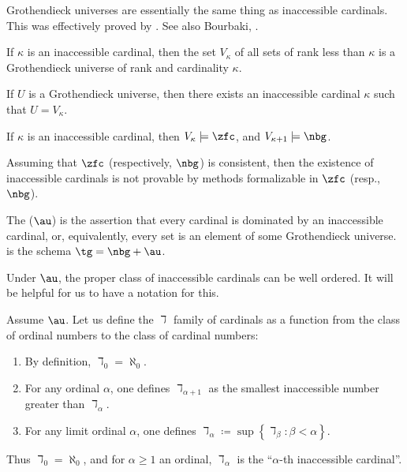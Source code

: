 Grothendieck universes are essentially the same thing as inaccessible cardinals.
This was effectively proved by \cite{Tarski1938}.
See also Bourbaki, \citeauthor[Exposé I, Appendix]{SGA4-1}.
\begin{proposition}
	If $\kappa$ is an inaccessible cardinal, then
	the set $V_{\kappa}$ of all sets of rank less than $\kappa$ is
	a Grothendieck universe of rank and cardinality $\kappa$.

	If $ U $ is a Grothendieck universe, then
	there exists an inaccessible cardinal $ \kappa $ such that $ U = V_{\kappa} $.
\end{proposition}

\begin{theorem}
	If $ \kappa $ is an inaccessible cardinal,
	then $V_{\kappa} \models \zfc $, and
	$ V_{\kappa+1} \models \nbg $.
	
	Assuming that $ \zfc $ (respectively, $ \nbg $) is consistent, then
	the existence of inaccessible cardinals is not provable
	by methods formalizable in $ \zfc $ (resp., $ \nbg $).
\end{theorem}

\begin{axiom}%
\label{axm:AU}
	The  ($ \au $) is the assertion that
	every cardinal is dominated by an inaccessible cardinal,
	or, equivalently, every set is an element of some Grothendieck universe.
	 is the schema $\tg = \nbg+\au$.
\end{axiom}

Under $ \au $, the proper class of inaccessible cardinals
can be well ordered.
It will be helpful for us to have a notation for this.

\begin{definition}
	Assume $ \au $.
	Let us define the $ \daleth $ family of cardinals
	as a function from the class of ordinal numbers
	to the class of cardinal numbers:
	\begin{enumerate}
		\item By definition, $ \daleth_0 = \aleph_0 $.
		\item For any ordinal $ \alpha $,
			one defines $ \daleth_{\alpha+1} $ as
			the smallest inaccessible number
			greater than $ \daleth_{\alpha} $.
		\item For any limit ordinal $ \alpha $,
			one defines
			$ \daleth_{\alpha} \coloneq \sup \left\{ \daleth_{\beta} :
			\beta < \alpha \right\} $.
	\end{enumerate}
	Thus $ \daleth_0 = \aleph_0 $, and
	for $ \alpha \geq 1$ an ordinal,
	$ \daleth_{\alpha} $ is the
	\enquote{$ \alpha $-th inaccessible cardinal}.
\end{definition}

